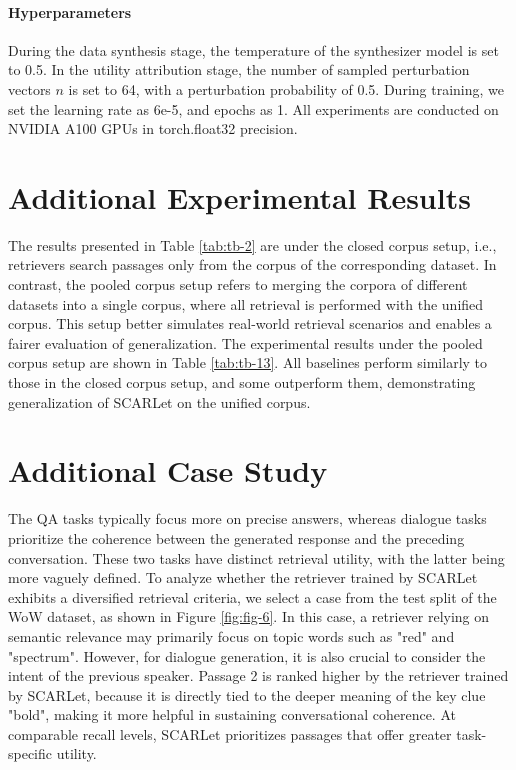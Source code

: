 \documentclass[11pt]{article}
\begin{document}
\paragraph{Hyperparameters} During the data synthesis stage, the temperature of the synthesizer model is set to 0.5. In the utility attribution stage, the number of sampled perturbation vectors $n$ is set to 64, with a perturbation probability of 0.5. During training, we set the learning rate as 6e-5, and epochs as 1. All experiments are conducted on NVIDIA A100 GPUs in torch.float32 precision.





\section{Additional Experimental Results}
\label{sec:appendix_d}


The results presented in Table \ref{tab:tb-2} are under the closed corpus setup, i.e., retrievers search passages only from the corpus of the corresponding dataset. In contrast, the pooled corpus setup refers to merging the corpora of different datasets into a single corpus, where all retrieval is performed with the unified corpus. This setup better simulates real-world retrieval scenarios and enables a fairer evaluation of generalization. The experimental results under the pooled corpus setup are shown in Table \ref{tab:tb-13}. All baselines perform similarly to those in the closed corpus setup, and some outperform them, demonstrating generalization of SCARLet on the unified corpus.




\section{Additional Case Study}
\label{sec:appendix_e}

The QA tasks typically focus more on precise answers, whereas dialogue tasks prioritize the coherence between the generated response and the preceding conversation. These two tasks have distinct retrieval utility, with the latter being more vaguely defined. To analyze whether the retriever trained by SCARLet exhibits a diversified retrieval criteria, we select a case from the test split of the WoW dataset, as shown in Figure \ref{fig:fig-6}. In this case, a retriever relying on semantic relevance may primarily focus on topic words such as "red" and "spectrum". However, for dialogue generation, it is also crucial to consider the intent of the previous speaker. Passage 2 is ranked higher by the retriever trained by SCARLet, because it is directly tied to the deeper meaning of the key clue "bold", making it more helpful in sustaining conversational coherence. At comparable recall levels, SCARLet prioritizes passages that offer greater task-specific utility.
\end{document}
